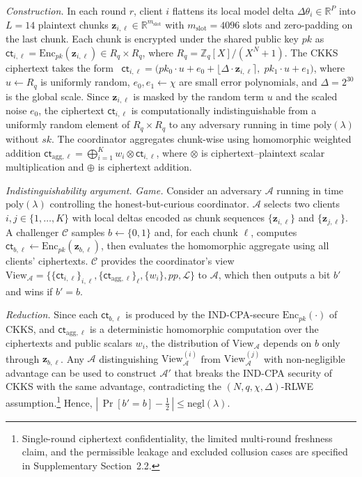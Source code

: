 \documentclass[journal]{IEEEtran}
\begin{document}
\emph{Construction.}
In each round $r$, client $i$ flattens its local model delta
$\Delta\theta_i \in \mathbb{R}^P$ into $L = 14$ plaintext
chunks $\mathbf{z}_{i,\ell} \in \mathbb{R}^{m_{\mathrm{slot}}}$ with
$m_{\mathrm{slot}} = 4096$ slots and zero-padding on the last chunk.
Each chunk is encrypted under the shared public key $pk$ as
$\mathsf{ct}_{i,\ell} = \mathrm{Enc}_{pk}(\mathbf{z}_{i,\ell}) \in R_q \times R_q$,
where $R_q = \mathbb{Z}_q[X]/(X^N+1)$.
The CKKS ciphertext takes the form~\cite{cheon2017ckks}
$\mathsf{ct}_{i,\ell}
= \bigl(pk_0 \cdot u + e_0 + \lfloor \Delta \cdot \mathbf{z}_{i,\ell} \rceil,\;
pk_1 \cdot u + e_1\bigr)$,
where $u \leftarrow R_q$ is uniformly random, $e_0, e_1 \leftarrow \chi$ are
small error polynomials, and $\Delta = 2^{30}$ is the global scale.
Since $\mathbf{z}_{i,\ell}$ is masked by the random term $u$ and the scaled
noise $e_0$, the ciphertext $\mathsf{ct}_{i,\ell}$ is computationally
indistinguishable from a uniformly random element of $R_q \times R_q$ to
any adversary running in time $\mathrm{poly}(\lambda)$ without $sk$.
The coordinator aggregates chunk-wise using homomorphic weighted addition
$\mathsf{ct}_{\mathrm{agg},\ell}
= \bigoplus_{i=1}^{K} w_i \otimes \mathsf{ct}_{i,\ell}$,
where $\otimes$ is ciphertext--plaintext scalar multiplication and $\oplus$
is ciphertext addition.

\emph{Indistinguishability argument.}
\emph{Game.} Consider an adversary $\mathcal{A}$ running in time
$\mathrm{poly}(\lambda)$ controlling the honest-but-curious coordinator.
$\mathcal{A}$ selects two clients $i, j \in \{1, \ldots, K\}$ with local
deltas encoded as chunk sequences $\{\mathbf{z}_{i,\ell}\}$ and
$\{\mathbf{z}_{j,\ell}\}$. A challenger $\mathcal{C}$ samples
$b \leftarrow \{0,1\}$ and, for each chunk $\ell$, computes
$\mathsf{ct}_{b,\ell} \gets \mathrm{Enc}_{pk}(\mathbf{z}_{b,\ell})$,
then evaluates the homomorphic aggregate using all clients' ciphertexts.
$\mathcal{C}$ provides the coordinator's view
$\mathrm{View}_{\mathcal{A}}
= \bigl\{\{\mathsf{ct}_{i,\ell}\}_{i,\ell},
\{\mathsf{ct}_{\mathrm{agg},\ell}\}_{\ell},
\{w_i\}, pp, \mathcal{L}\bigr\}$
to $\mathcal{A}$, which then outputs a bit $b'$ and wins if $b' = b$.

\emph{Reduction.} Since each $\mathsf{ct}_{b,\ell}$ is produced by the
IND-CPA-secure $\mathrm{Enc}_{pk}(\cdot)$ of CKKS, and
$\mathsf{ct}_{\mathrm{agg},\ell}$ is a deterministic homomorphic computation
over the ciphertexts and public scalars $w_i$, the distribution of
$\mathrm{View}_{\mathcal{A}}$ depends on $b$ only through
$\mathbf{z}_{b,\ell}$. Any $\mathcal{A}$ distinguishing
$\mathrm{View}_{\mathcal{A}}^{(i)}$ from $\mathrm{View}_{\mathcal{A}}^{(j)}$
with non-negligible advantage can be used to construct $\mathcal{A}'$ that
breaks the IND-CPA security of CKKS with the same advantage, contradicting the
$(N, q, \chi, \Delta)$-RLWE assumption.\footnote{Single-round ciphertext
confidentiality, the limited multi-round freshness claim, and the permissible
leakage and excluded collusion cases are specified in Supplementary
Section~2.2.} Hence,
$\left|\,\Pr[b' = b] - \tfrac{1}{2}\,\right| \le \mathrm{negl}(\lambda)$.
\end{document}
